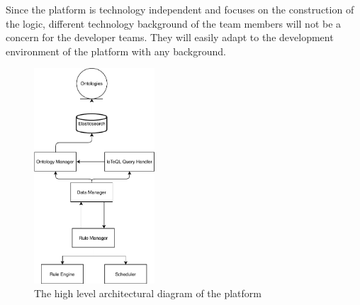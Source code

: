 Since the platform is technology independent and focuses on the construction of the logic, different technology background of the team members will not be a concern for the developer teams. They will easily adapt to the development environment of the platform with any background.
\begin{figure}[h]
  \centering
  \includegraphics[width=0.4\textwidth,height=\textheight,keepaspectratio]{figures/high_level_architectural_diagram.pdf}
  \caption[Platform Architecture]{The high level architectural diagram of the platform}\label{fig:architecture}
\end{figure}

